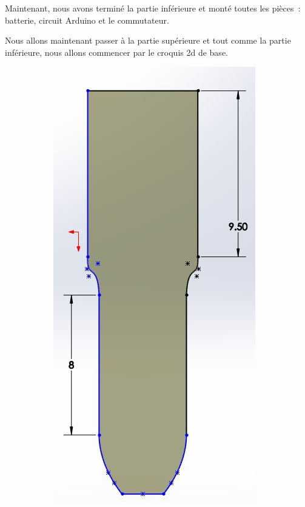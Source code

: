 \FloatBarrier

Maintenant, nous avons terminé la partie inférieure et monté toutes les pièces : batterie, circuit Arduino et le commutateur.

Nous allons maintenant passer à la partie supérieure et tout comme la partie inférieure, nous allons commencer par le croquis 2d de base.

\begin{figure}[!htbp]
    \centering
          \begin{subfigure}{.45\linewidth}
                \centering
                \includegraphics[width=\linewidth]{assets/conception1/img227.jpg}

\end{subfigure}
\end{figure}
